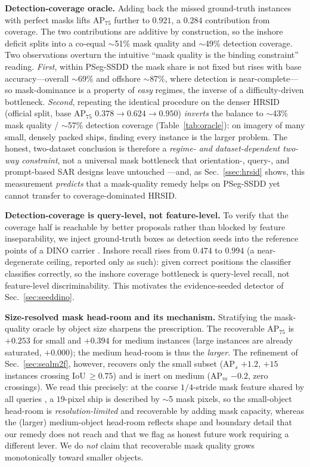 \documentclass[journal]{IEEEtran}
\begin{document}
\textbf{Detection-coverage oracle.} Adding back the missed ground-truth instances with perfect masks lifts AP$_{75}$ further to $0.921$, a $0.284$ contribution from coverage. The two contributions are additive by construction, so the inshore deficit splits into a co-equal $\sim$51\% mask quality and $\sim$49\% detection coverage. Two observations overturn the intuitive ``mask quality is the binding constraint'' reading. \emph{First}, within PSeg-SSDD the mask share is not fixed but rises with base accuracy---overall $\sim$69\% and offshore $\sim$87\%, where detection is near-complete---so mask-dominance is a property of \emph{easy} regimes, the inverse of a difficulty-driven bottleneck. \emph{Second}, repeating the identical procedure on the denser HRSID (official split, base AP$_{75}$ $0.378\!\rightarrow\!0.624\!\rightarrow\!0.950$) \emph{inverts} the balance to $\sim$43\% mask quality / $\sim$57\% detection coverage (Table~\ref{tab:oracle}): on imagery of many small, densely packed ships, finding every instance is the larger problem. The honest, two-dataset conclusion is therefore a \emph{regime- and dataset-dependent two-way constraint}, not a universal mask bottleneck that orientation-, query-, and prompt-based SAR designs leave untouched \cite{gao2025o2former,xu2025diffsarshipinst,zheng2024mcsamseg}---and, as Sec.~\ref{ssec:hrsid} shows, this measurement \emph{predicts} that a mask-quality remedy helps on PSeg-SSDD yet cannot transfer to coverage-dominated HRSID.

\textbf{Detection-coverage is query-level, not feature-level.} To verify that the coverage half is reachable by better proposals rather than blocked by feature inseparability, we inject ground-truth boxes as detection seeds into the reference points of a DINO carrier \cite{zhang2023dino}. Inshore recall rises from $0.474$ to $0.994$ (a near-degenerate ceiling, reported only as such): given correct positions the classifier classifies correctly, so the inshore coverage bottleneck is query-level recall, not feature-level discriminability. This motivates the evidence-seeded detector of Sec.~\ref{sec:seeddino}.

\textbf{Size-resolved mask head-room and its mechanism.} Stratifying the mask-quality oracle by object size sharpens the prescription. The recoverable AP$_{75}$ is $+0.253$ for small and $+0.394$ for medium instances (large instances are already saturated, $+0.000$); the medium head-room is thus the \emph{larger}. The refinement of Sec.~\ref{sec:sealm2f}, however, recovers only the small subset (AP$_s$ $+1.2$, $+15$ instances crossing IoU$\,\ge\!0.75$) and is inert on medium (AP$_m$ $-0.2$, zero crossings). We read this precisely: at the coarse $1/4$-stride mask feature shared by all queries \cite{cheng2022mask2former}, a $19$-pixel ship is described by $\sim$5 mask pixels, so the small-object head-room is \emph{resolution-limited} and recoverable by adding mask capacity, whereas the (larger) medium-object head-room reflects shape and boundary detail that our remedy does not reach and that we flag as honest future work requiring a different lever. We do \emph{not} claim that recoverable mask quality grows monotonically toward smaller objects.
\end{document}
